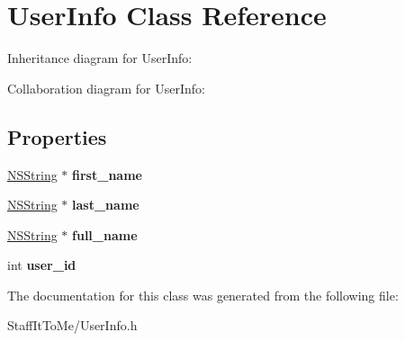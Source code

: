 \hypertarget{interface_user_info}{
\section{\-User\-Info \-Class \-Reference}
\label{interface_user_info}
}


\-Inheritance diagram for \-User\-Info\-:


\-Collaboration diagram for \-User\-Info\-:
\subsection*{\-Properties}
\begin{DoxyCompactItemize}
\item 
\hypertarget{interface_user_info_ac61b37d3dd65740f4ffa5990dd8203e3}{
\hyperlink{class_n_s_string}{\-N\-S\-String} $\ast$ {\bfseries first\-\_\-name}}
\label{interface_user_info_ac61b37d3dd65740f4ffa5990dd8203e3}

\item 
\hypertarget{interface_user_info_a6a4001bbc38a357ae1e6c71ac39d53cd}{
\hyperlink{class_n_s_string}{\-N\-S\-String} $\ast$ {\bfseries last\-\_\-name}}
\label{interface_user_info_a6a4001bbc38a357ae1e6c71ac39d53cd}

\item 
\hypertarget{interface_user_info_aae0dd8d86a98b20f45bb5ffb8413bc97}{
\hyperlink{class_n_s_string}{\-N\-S\-String} $\ast$ {\bfseries full\-\_\-name}}
\label{interface_user_info_aae0dd8d86a98b20f45bb5ffb8413bc97}

\item 
\hypertarget{interface_user_info_a31cf1be8c1e4c9fe59298c8cf1c49dfd}{
int {\bfseries user\-\_\-id}}
\label{interface_user_info_a31cf1be8c1e4c9fe59298c8cf1c49dfd}

\end{DoxyCompactItemize}


\-The documentation for this class was generated from the following file\-:\begin{DoxyCompactItemize}
\item 
\-Staff\-It\-To\-Me/\-User\-Info.\-h\end{DoxyCompactItemize}
